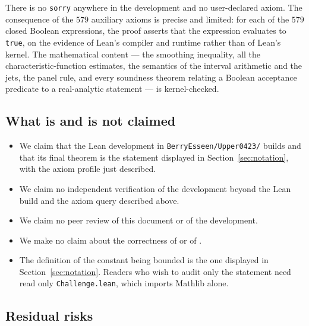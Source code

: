 \documentclass[11pt,a4paper]{article}
\theoremstyle{definition}
\newcommand{\Lean}[1]{\texttt{#1}}
\newcommand{\file}[1]{\texttt{#1}}
\begin{document}
There is no \Lean{sorry} anywhere in the development and no user-declared
axiom. The consequence of the $579$ auxiliary axioms is precise and limited: for
each of the $579$ closed Boolean expressions, the proof asserts that the
expression evaluates to \Lean{true}, on the evidence of Lean's compiler and
runtime rather than of Lean's kernel. The mathematical content --- the smoothing
inequality, all the characteristic-function estimates, the semantics of the
interval arithmetic and the jets, the panel rule, and every soundness theorem
relating a Boolean acceptance predicate to a real-analytic statement --- is
kernel-checked.

\subsection{What is and is not claimed}

\begin{itemize}[leftmargin=1.6em]
\item We claim that the Lean development in \file{BerryEsseen/Upper0423/} builds
  and that its final theorem is the statement displayed in
  Section~\ref{sec:notation}, with the axiom profile just described.
\item We claim no independent verification of the development beyond the Lean
  build and the axiom query described above.
\item We claim no peer review of this document or of the development.
\item We make no claim about the correctness of \cite{XiaoLi2026} or of
  \cite{IndependentBE2026}.
\item The definition of the constant being bounded is the one displayed in
  Section~\ref{sec:notation}. Readers who wish to audit only the statement need
  read only \file{Challenge.lean}, which imports Mathlib alone.
\end{itemize}

\subsection{Residual risks}
\end{document}
